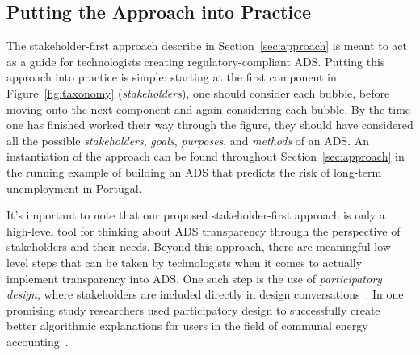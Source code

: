 \subsection{Putting the Approach into Practice}
The stakeholder-first approach describe in Section~\ref{sec:approach} is meant to act as a guide for technologists creating regulatory-compliant ADS. Putting this approach into practice is simple: starting at the first component in Figure~\ref{fig:taxonomy} (\emph{stakeholders}), one should consider each bubble, before moving onto the next component and again considering each bubble. By the time one has finished worked their way through the figure, they should have considered all the possible \emph{stakeholders}, \emph{goals}, \emph{purposes}, and \emph{methods} of an ADS. An instantiation of the approach can be found throughout Section~\ref{sec:approach} in the running example of building an ADS that predicts the risk of long-term unemployment in Portugal.

It's important to note that our proposed stakeholder-first approach is only a high-level tool for thinking about ADS transparency through the perspective of stakeholders and their needs. Beyond this approach, there are meaningful low-level steps that can be taken by technologists when it comes to actually implement transparency into ADS. One such step is the use of \emph{participatory design}, where stakeholders are included directly in design conversations~\cite{eiband2018bringing, cech2021tackling, aizenberg2020designing, gupta2020participatory}. In one promising study researchers used participatory design to successfully create better algorithmic explanations for users in the field of communal energy accounting~\cite{cech2021tackling}.





